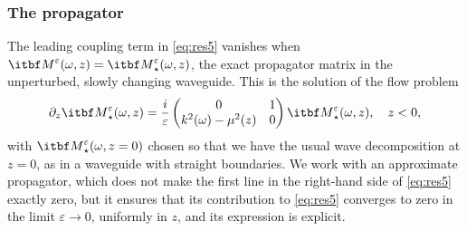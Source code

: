 \documentclass[final]{siamltex}
\begin{document}
\subsubsection{The propagator}
The leading coupling term in \eqref{eq:res5} vanishes when
${{\itbf M}}^{\varepsilon}({\omega},z) = {{\itbf M}}_\star^{\varepsilon}({\omega},z)$, the exact propagator matrix
in the unperturbed, slowly changing waveguide. This is the solution of
the flow problem
\[
\partial_z {{\itbf M}}_\star^{\varepsilon}({\omega},z) = \frac{i}{\varepsilon} \begin{pmatrix} 0 & 1
  \\ k^2({\omega}) - \mu^2(z) & 0 \end{pmatrix} {{\itbf M}}_\star^{\varepsilon}({\omega},z), \quad
z<0,
\]
with ${{\itbf M}}_\star^{\varepsilon}({\omega},z=0)$ chosen so that we have the usual wave
decomposition at $z=0$, as in a waveguide with straight boundaries.
We work with an approximate propagator, which does not make the first
line in the right-hand side of \eqref{eq:res5} exactly zero, but it ensures that its
contribution to \eqref{eq:res5} converges to zero in the limit ${\varepsilon}
\to 0$, uniformly in $z$, and its expression is explicit.
\end{document}
